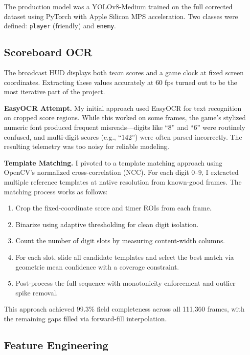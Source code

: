 \documentclass[10pt, twocolumn]{article}
\begin{document}
The production model was a YOLOv8-Medium trained on the full corrected dataset using PyTorch \cite{paszke2019pytorch} with Apple Silicon MPS acceleration. Two classes were defined: \texttt{player} (friendly) and \texttt{enemy}.

\subsection{Scoreboard OCR}

The broadcast HUD displays both team scores and a game clock at fixed screen coordinates. Extracting these values accurately at 60 fps turned out to be the most iterative part of the project.

\textbf{EasyOCR Attempt.} My initial approach used EasyOCR for text recognition on cropped score regions. While this worked on some frames, the game's stylized numeric font produced frequent misreads---digits like ``8'' and ``6'' were routinely confused, and multi-digit scores (e.g., ``142'') were often parsed incorrectly. The resulting telemetry was too noisy for reliable modeling.

\textbf{Template Matching.} I pivoted to a template matching approach using OpenCV's \cite{bradski2000} normalized cross-correlation (NCC). For each digit 0--9, I extracted multiple reference templates at native resolution from known-good frames. The matching process works as follows:

\begin{enumerate}
    \item Crop the fixed-coordinate score and timer ROIs from each frame.
    \item Binarize using adaptive thresholding for clean digit isolation.
    \item Count the number of digit slots by measuring content-width columns.
    \item For each slot, slide all candidate templates and select the best match via geometric mean confidence with a coverage constraint.
    \item Post-process the full sequence with monotonicity enforcement and outlier spike removal.
\end{enumerate}

This approach achieved 99.3\% field completeness across all 111,360 frames, with the remaining gaps filled via forward-fill interpolation.

\subsection{Feature Engineering}
\end{document}
